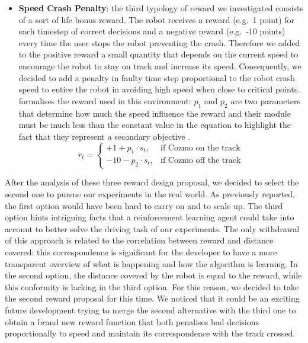 \begin{itemize}
    \item \textbf{Speed Crash Penalty}: the third typology of reward we investigated consists of a sort of life bonus reward.
          The robot receives a reward (e.g.\ 1 point) for each timestep of correct decisions and a negative reward (e.g.\ -10 points) every time the user stops the robot preventing the crash.
          Therefore we added to the positive reward a small quantity that depends on the current speed to encourage the robot to stay on track and increase its speed.
          Consequently, we decided to add a penalty in faulty time step proportional to the robot crash speed to entice the robot in avoiding high speed when close to critical points.
           formalises the reward used in this environment: $p_1$ and $p_2$ are two parameters that determine how much the speed influence the reward and their module must be much less than the constant value in the equation to highlight the fact that they represent a secondary objective \cite{raffin2019learning}.
          \begin{equation}
              r_t = \begin{cases}
                  +1 + p_1 \cdot s_t, & \mbox{if } \mbox{Cozmo on the track} \\ -10 - p_2 \cdot s_t, & \mbox{if } \mbox{Cozmo off the track}
              \end{cases}
              \label{eq:speedCrashPenalty}
          \end{equation}

\end{itemize}

After the analysis of these three reward design proposal, we decided to select the second one to pursue our experiments in the real world.
As previously reported, the first option would have been hard to carry on and to scale up.
The third option hints intriguing facts that a reinforcement learning agent could take into account to better solve the driving task of our experiments.
The only withdrawal of this approach is related to the correlation between reward and distance covered: this correspondence is significant for the developer to have a more transparent overview of what is happening and how the algorithm is learning.
In the second option, the distance covered by the robot is equal to the reward, while this conformity is lacking in the third option.
For this reason, we decided to take the second reward proposal for this time.
We noticed that it could be an exciting future development trying to merge the second alternative with the third one to obtain a brand new reward function that both penalises bad decisions proportionally to speed and maintain its correspondence with the track crossed.

